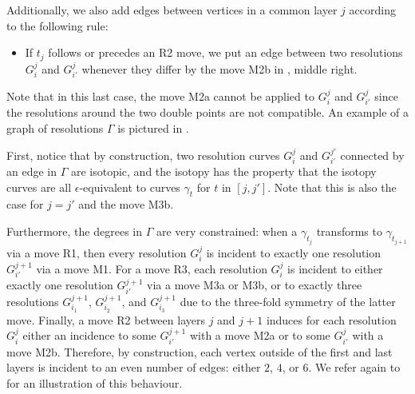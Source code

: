 \documentclass{article}
\begin{document}
Additionally, we also add edges between vertices in a common layer $j$ according to the following rule:

\begin{itemize}
\item If $t_j$ follows or precedes an R2 move, we put an edge between two resolutions $G^j_i$ and $G^{j}_{i'}$ whenever they differ by the move M2b in , middle right.
\end{itemize}

Note that in this last case, the move M2a cannot be applied to $G^j_i$ and $G^j_{i'}$ since the resolutions around the two double points are not compatible. An example of a graph of resolutions $\Gamma$ is pictured in .

First, notice that by construction, two resolution curves $G^j_i$ and $G^{j'}_{i'}$ connected by an edge in $\Gamma$ are isotopic, and the isotopy has the property that the isotopy curves are all $\epsilon$-equivalent to curves $\gamma_{t}$ for $t$ in $[j,j']$. Note that this is also the case for $j=j'$ and the move M3b.

Furthermore, the degrees in $\Gamma$ are very constrained: when a $\gamma_{t_j}$ transforms to $\gamma_{t_{j+1}}$ via a move R1, then every resolution $G^j_i$ is incident to exactly one resolution $G^{j+1}_{i'}$ via a move M1. For a move R3, each resolution $G^j_i$ is incident to either exactly one resolution $G^{j+1}_{i'}$ via a move M3a or M3b, or to exactly three resolutions $G^{j+1}_{i_1}$, $G^{j+1}_{i_2}$, and $G^{j+1}_{i_3}$ due to the three-fold symmetry of the latter move. Finally, a move R2 between layers $j$ and $j+1$ induces for each resolution $G^j_i$ either an incidence to some $G^{j+1}_{i'}$ with a move M2a or to some  $G^j_{i'}$ with a move M2b. Therefore, by construction, each vertex outside of the first and last layers is incident to an even number of edges: either $2$, $4$, or $6$. We refer again to  for an illustration of this behaviour.
\end{document}
